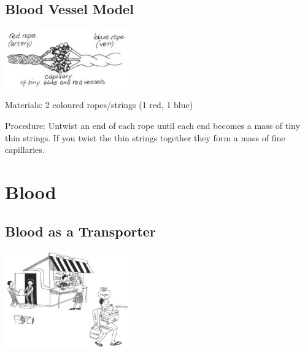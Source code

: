 \begin{multicols}{2}
\subsection{Blood Vessel Model} %

\begin{center}
\includegraphics[width=0.4\textwidth]{./img/vso/blood-vessels.jpg}
\end{center}

\begin{description*}
\item[Materials:]{2 coloured ropes/strings (1 red, 1 blue)}
\item[Procedure:]{Untwist an end of each
rope until each end becomes a
mass of tiny thin strings. If you
twist the thin strings together
they form a mass of fine
capillaries.}
\end{description*}


\section*{Blood}


\subsection{Blood as a Transporter} %

\begin{center}
\includegraphics[width=0.4\textwidth]{./img/vso/blood-transport.jpg}
\end{center}


\end{multicols}
